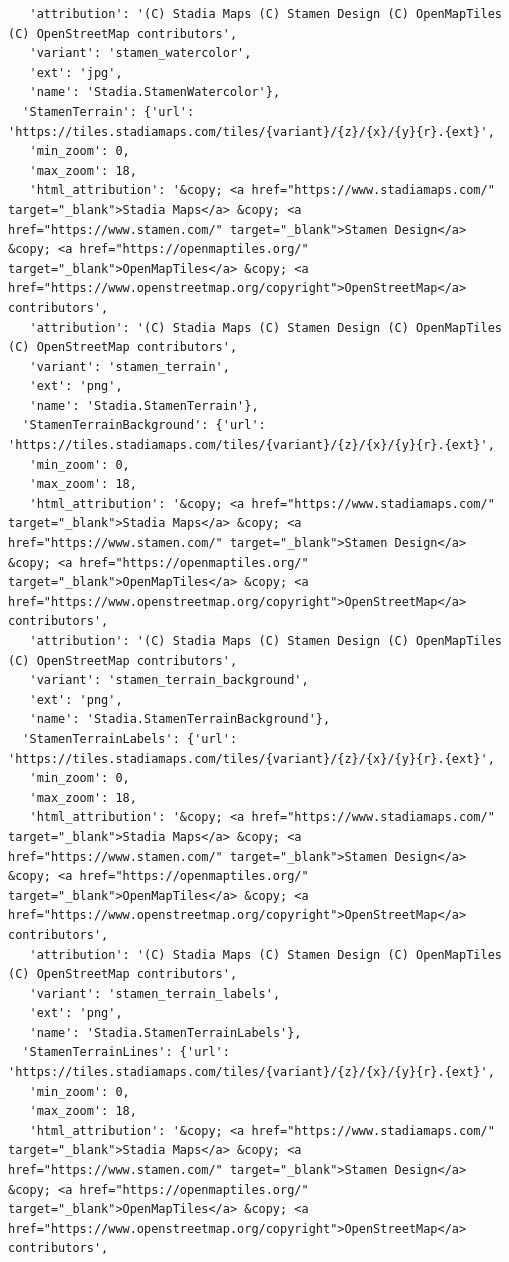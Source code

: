 \documentclass[
  letterpaper,
  DIV=11,
  numbers=noendperiod]{scrreprt}
\begin{document}
\begin{verbatim}
   'attribution': '(C) Stadia Maps (C) Stamen Design (C) OpenMapTiles (C) OpenStreetMap contributors',
   'variant': 'stamen_watercolor',
   'ext': 'jpg',
   'name': 'Stadia.StamenWatercolor'},
  'StamenTerrain': {'url': 'https://tiles.stadiamaps.com/tiles/{variant}/{z}/{x}/{y}{r}.{ext}',
   'min_zoom': 0,
   'max_zoom': 18,
   'html_attribution': '&copy; <a href="https://www.stadiamaps.com/" target="_blank">Stadia Maps</a> &copy; <a href="https://www.stamen.com/" target="_blank">Stamen Design</a> &copy; <a href="https://openmaptiles.org/" target="_blank">OpenMapTiles</a> &copy; <a href="https://www.openstreetmap.org/copyright">OpenStreetMap</a> contributors',
   'attribution': '(C) Stadia Maps (C) Stamen Design (C) OpenMapTiles (C) OpenStreetMap contributors',
   'variant': 'stamen_terrain',
   'ext': 'png',
   'name': 'Stadia.StamenTerrain'},
  'StamenTerrainBackground': {'url': 'https://tiles.stadiamaps.com/tiles/{variant}/{z}/{x}/{y}{r}.{ext}',
   'min_zoom': 0,
   'max_zoom': 18,
   'html_attribution': '&copy; <a href="https://www.stadiamaps.com/" target="_blank">Stadia Maps</a> &copy; <a href="https://www.stamen.com/" target="_blank">Stamen Design</a> &copy; <a href="https://openmaptiles.org/" target="_blank">OpenMapTiles</a> &copy; <a href="https://www.openstreetmap.org/copyright">OpenStreetMap</a> contributors',
   'attribution': '(C) Stadia Maps (C) Stamen Design (C) OpenMapTiles (C) OpenStreetMap contributors',
   'variant': 'stamen_terrain_background',
   'ext': 'png',
   'name': 'Stadia.StamenTerrainBackground'},
  'StamenTerrainLabels': {'url': 'https://tiles.stadiamaps.com/tiles/{variant}/{z}/{x}/{y}{r}.{ext}',
   'min_zoom': 0,
   'max_zoom': 18,
   'html_attribution': '&copy; <a href="https://www.stadiamaps.com/" target="_blank">Stadia Maps</a> &copy; <a href="https://www.stamen.com/" target="_blank">Stamen Design</a> &copy; <a href="https://openmaptiles.org/" target="_blank">OpenMapTiles</a> &copy; <a href="https://www.openstreetmap.org/copyright">OpenStreetMap</a> contributors',
   'attribution': '(C) Stadia Maps (C) Stamen Design (C) OpenMapTiles (C) OpenStreetMap contributors',
   'variant': 'stamen_terrain_labels',
   'ext': 'png',
   'name': 'Stadia.StamenTerrainLabels'},
  'StamenTerrainLines': {'url': 'https://tiles.stadiamaps.com/tiles/{variant}/{z}/{x}/{y}{r}.{ext}',
   'min_zoom': 0,
   'max_zoom': 18,
   'html_attribution': '&copy; <a href="https://www.stadiamaps.com/" target="_blank">Stadia Maps</a> &copy; <a href="https://www.stamen.com/" target="_blank">Stamen Design</a> &copy; <a href="https://openmaptiles.org/" target="_blank">OpenMapTiles</a> &copy; <a href="https://www.openstreetmap.org/copyright">OpenStreetMap</a> contributors',

\end{verbatim}
\end{document}
